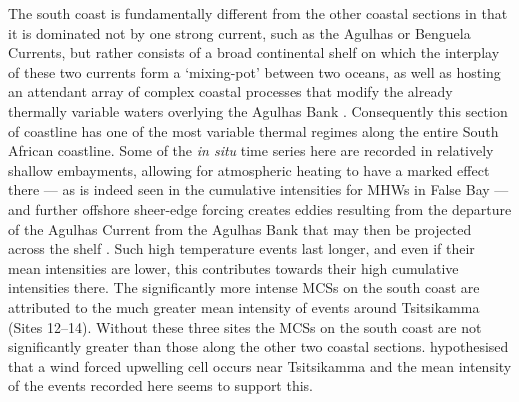 \documentclass[a4paper,10pt,review]{elsarticle}
\begin{document}
The south coast is fundamentally different from the other coastal sections in that it is dominated not by one strong current, such as the Agulhas or Benguela Currents, but rather consists of a broad continental shelf on which the interplay of these two currents form a `mixing-pot' between two oceans, as well as hosting an attendant array of complex coastal processes that modify the already thermally variable waters overlying the Agulhas Bank \citep{Lutjeharms2003, Roberts2005, Hutchings2009}. Consequently this section of coastline has one of the most variable thermal regimes along the entire South African coastline. Some of the \emph{in situ} time series here are recorded in relatively shallow embayments, allowing for atmospheric heating to have a marked effect there --- as is indeed seen in the cumulative intensities for MHWs in False Bay --- and further offshore sheer-edge forcing creates eddies resulting from the departure of the Agulhas Current from the Agulhas Bank that may then be projected across the shelf \citep{Lutjeharms2003}. Such high temperature events last longer, and even if their mean intensities are lower, this contributes towards their high cumulative intensities there. The significantly more intense MCSs on the south coast are attributed to the much greater mean intensity of events around Tsitsikamma (Sites 12--14). Without these three sites the MCSs on the south coast are not significantly greater than those along the other two coastal sections. \citep{Roberts2005} hypothesised that a wind forced upwelling cell occurs near Tsitsikamma and the mean intensity of the events recorded here seems to support this.
\end{document}
